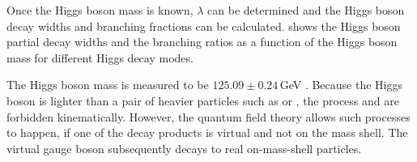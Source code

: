 Once the Higgs boson mass is known, $\lambda$ can be determined and the Higgs boson decay widths and branching fractions can be calculated.  shows the Higgs boson partial decay widths and the branching ratios as a function of the Higgs boson mass for different Higgs decay modes.






The Higgs boson mass is measured to be $125.09\pm0.24$\,GeV \cite{Agashe:2014kda}. Because the Higgs boson is lighter than a pair of heavier particles such as \HepProcess{\PWp\PWm} or \HepProcess{\PZ\PZ}, the process \HepProcess{\PH \to \PWp\PWm} and \HepProcess{\PH \to \PZ\PZ} are forbidden kinematically. However,  the quantum field theory allows such processes to happen, if one of the decay products is virtual and not on the mass shell. The virtual gauge boson subsequently decays to real on-mass-shell particles. 


